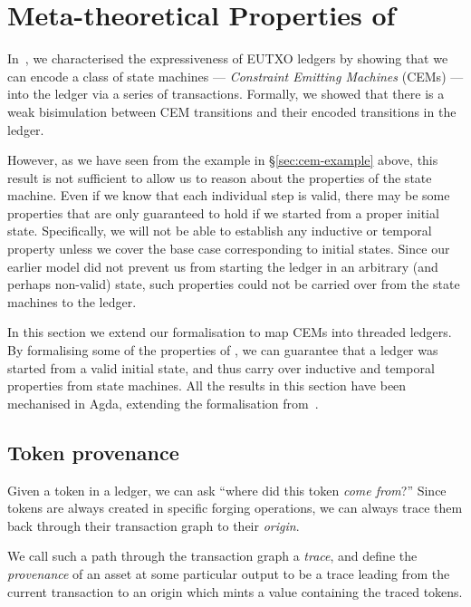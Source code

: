 \section{Meta-theoretical Properties of \EUTXOma}
\label{sec:formalization}

In~\cite{eutxo-1-paper}, we characterised the expressiveness of EUTXO
ledgers by showing that we can encode a class of state machines ---
\textit{Constraint Emitting Machines} (CEMs) --- into the ledger via a series
of transactions.  Formally, we showed that there is a weak
bisimulation between CEM transitions and their encoded
transitions in the ledger.

However, as we have seen from the example in \S\ref{sec:cem-example} above,
this result is not sufficient to allow us to reason about the properties
of the state machine.  Even if we know that each individual step is valid,
there may be some properties that are only guaranteed to hold if we started
from a proper initial state.
Specifically, we will not be able to establish any inductive or temporal property
unless we cover the base case corresponding to initial states.
Since our earlier model did not prevent
us from starting the ledger in an arbitrary (and perhaps non-valid) state, such
properties could not be carried over from the state machines to the
ledger.

In this section we extend our formalisation to map CEMs into threaded
ledgers.  By formalising some of the properties of \EUTXOma, we can
guarantee that a ledger was started from a valid initial state, and
thus carry over inductive and temporal properties from state machines.  All
the results in this section have been mechanised in Agda,
extending the formalisation from~\cite{eutxo-1-paper}.

\subsection{Token provenance}

Given a token in a \EUTXOma{} ledger, we can ask ``where did this token
\emph{come from}?''  Since tokens are always created in specific
forging operations, we can always trace them back through their
transaction graph to their \textit{origin}.

We call such a path through the transaction graph a \emph{trace}, and
define the \emph{provenance} of an asset at some particular output
to be a trace leading from the current transaction to an origin which
mints a value containing the traced tokens.


